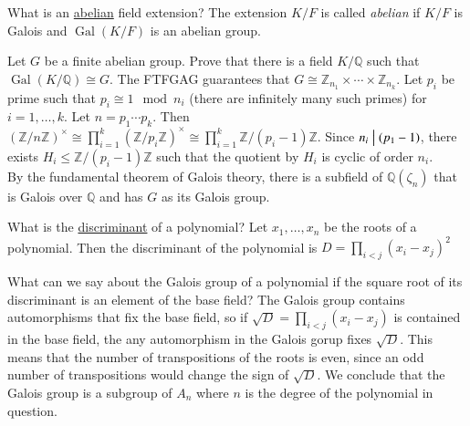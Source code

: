 \documentclass[avery5371,grid]{flashcards}
\newcommand{\Z}{\mathbb{Z}}
\newcommand{\Q}{\mathbb{Q}}
\newcommand{\divides}{\bigm|}
\DeclareMathOperator{\Gal}{Gal}
\begin{document}
\begin{flashcard}[Fields]{What is an \underline{abelian} field extension?}
 The extension $K/F$ is called \emph{abelian} if $K/F$ is Galois and $\Gal(K/F)$ is an abelian group.
\end{flashcard}

\begin{flashcard}[Fields]{Let $G$ be a finite abelian group. Prove that there is a field $K/\Q$ such that $\Gal(K/\Q) \cong G$.}
 The FTFGAG guarantees that $G \cong \Z_{n_1} \times \cdots \times \Z_{n_k}$. Let $p_i$ be prime such that $p_i \cong 1 \mod n_i$ (there are infinitely many such primes) for $i = 1, \ldots, k$. Let $n = p_1 \cdots p_k$. Then $(\Z/n\Z)^\times \cong  \prod_{i=1}^k (\Z/p_i\Z)^\times \cong  \prod_{i=1}^k \Z/(p_i - 1)\Z$. Since $n_i \divides (p_1 - 1)$, there exists $H_i \leq \Z/(p_i-1)\Z$ such that the quotient by $H_i$ is cyclic of order $n_i$. \\
 
 
 By the fundamental theorem of Galois theory, there is a subfield of $\Q(\zeta_n)$ that is Galois over $\Q$ and has $G$ as its Galois group.
\end{flashcard}

\begin{flashcard}[Fields]{What is the \underline{discriminant} of a polynomial?}
 Let $x_1, \ldots, x_n$ be the roots of a polynomial. Then the discriminant of the polynomial is $D = \displaystyle \prod_{i<j}(x_i - x_j)^2$
\end{flashcard}

\begin{flashcard}[Fields]{What can we say about the Galois group of a polynomial if the square root of its discriminant is an element of the base field?}
 The Galois group contains automorphisms that fix the base field, so if $\sqrt{D} = \displaystyle \prod_{i<j} (x_i - x_j)$ is contained in the base field, the any automorphism in the Galois gorup fixes $\sqrt{D}$. This means that the number of transpositions of the roots is even, since an odd number of transpositions would change the sign of $\sqrt{D}$. We conclude that the Galois group is a subgroup of $A_n$ where $n$ is the degree of the polynomial in question.
\end{flashcard}
\end{document}
